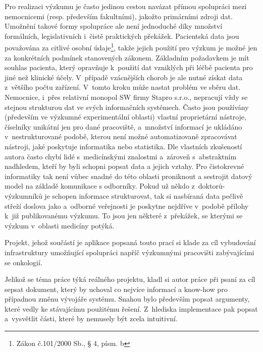 \documentclass[11pt,draft,oneside]{fithesis2}
\begin{document}
Pro realizaci výzkumu je často jedinou cestou navázat přímou spolupráci mezi nemocnicemi (resp. především fakultními), jakožto primárními zdroji dat. Umožnění takové formy spolupráce ale není jednoduché díky množství formálních, legislativních i~čistě praktických překážek. Pacientská data jsou považována za citlivé osobní údaje\footnote{Zákon č.101/2000 Sb., § 4, písm. b }, takže jejich použití pro výzkum je možné jen za konkrétních podmínek stanovených zákonem. Základním požadavkem je mít souhlas pacienta, který opravňuje k~použití dat vzniklých při léčbě pacienta pro jiné než klinické účely. V~případě vzácnějších chorob je ale nutné získat data z~většího počtu zařízení. V~tomto kroku může nastat problém ve sběru dat. Nemocnice, i~přes relativní monopol SW firmy Stapro s.r.o., nepracují vždy se stejnou strukturou dat ve svých informačních systémech. Často jsou používány (především ve výzkumné experimentální oblasti) vlastní proprietární nástroje, číselníky unikátní jen pro dané pracoviště, a~množství informací je ukládáno v~nestrukturované podobě, kterou není možné automatizovaně zpracovávat nástroji, jaké poskytuje informatika nebo statistika. Dle vlastních zkušeností autora často chybí lidé s~medicínskými znalostmi a~zároveň s~abstraktním nadhledem, kteří by byli schopni popsat data a jejich vztahy. Pro čistokrevné informatiky tak není vůbec snadné do této oblasti proniknout a sestrojit datový model na základě komunikace s odborníky. Pokud už někdo z~doktorů-výzkumníků je schopen informace strukturovat, tak si nasbíraná data pečlivě střeží doslova jako  a~odborné veřejnosti je poskytne nejdříve v~podobě přílohy k~již publikovanému výzkumu. To jsou jen některé z~překážek, se kterými se výzkum v~oblasti medicíny potýká.

Projekt, jehož součástí je aplikace popsaná touto prací si klade za cíl vybudování infrastruktury umožňující spolupráci napříč výzkumnými pracovišti zabývajícími se onkologií. 

Jelikož se téma práce týká reálného projektu, kladl si autor práce při psaní za cíl sepsat dokument, který by uchoval co nejvíce informací a know-how pro případnou změnu vývojáře systému. Snahou bylo především popsat argumenty, které vedly ke stávajícímu použitému řešení. Z~hlediska implementace pak popsat a~vysvětlit části, které by nemusely být zcela intuitivní.
\end{document}
